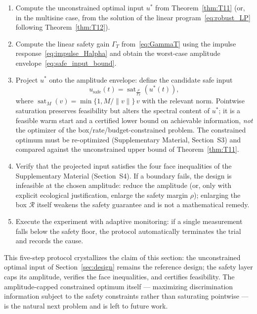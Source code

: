 \begin{enumerate}
\item Compute the unconstrained optimal input \(u^*\) from Theorem~\ref{thm:T11} (or, in the multisine case, from the solution of the linear program~\eqref{eq:robust_LP} following Theorem~\ref{thm:T12}).
\item Compute the linear safety gain \(\Gamma_T\) from~\eqref{eq:GammaT} using the impulse response~\eqref{eq:impulse_Halpha} and obtain the worst-case amplitude envelope~\eqref{eq:safe_input_bound}.
\item Project \(u^*\) onto the amplitude envelope: define the candidate safe input
\begin{equation}
u_{\text{safe}}(t) = \operatorname{sat}_{\frac{\rho}{\Gamma_T}}\!(u^*(t)),
\end{equation}
where \(\operatorname{sat}_M(v) = \min\{1, M/\|v\|\} \, v\) with the relevant norm. Pointwise saturation preserves feasibility but alters the spectral content of \(u^*\); it is a feasible warm start and a certified lower bound on achievable information, \emph{not} the optimizer of the box/rate/budget-constrained problem. The constrained optimum must be re-optimized (Supplementary Material, Section~S3) and compared against the unconstrained upper bound of Theorem~\ref{thm:T11}.
\item Verify that the projected input satisfies the four face inequalities of the Supplementary Material (Section~S4). If a boundary fails, the design is infeasible at the chosen amplitude: reduce the amplitude (or, only with explicit ecological justification, enlarge the safety margin \(\rho\)); enlarging the box \(\mathcal{R}\) itself weakens the safety guarantee and is not a mathematical remedy.
\item Execute the experiment with adaptive monitoring: if a single measurement falls below the safety floor, the protocol automatically terminates the trial and records the cause.
\end{enumerate}

This five-step protocol crystallizes the claim of this section: the unconstrained optimal input of Section~\ref{sec:design} remains the reference design; the safety layer caps its amplitude, verifies the face inequalities, and certifies feasibility. The amplitude-capped constrained optimum itself --- maximizing discrimination information subject to the safety constraints rather than saturating pointwise --- is the natural next problem and is left to future work.


